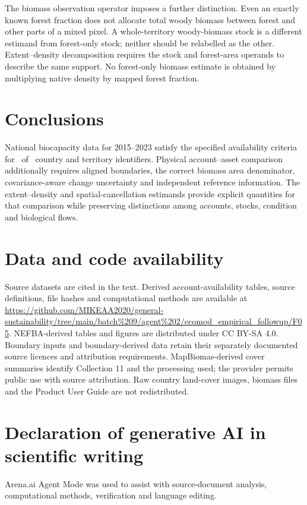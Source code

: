 \documentclass[11pt,a4paper]{article}
\begin{document}
The biomass observation operator imposes a further distinction. Even an exactly known forest fraction does not allocate total woody biomass between forest and other parts of a mixed pixel. A whole-territory woody-biomass stock is a different estimand from forest-only stock; neither should be relabelled as the other. Extent--density decomposition requires the stock and forest-area operands to describe the same support. No forest-only biomass estimate is obtained by multiplying native density by mapped forest fraction.

\section{Conclusions}
National biocapacity data for 2015--2023 satisfy the specified availability criteria for \AccountPass\ of \CountryIDs\ country and territory identifiers. Physical account--asset comparison additionally requires aligned boundaries, the correct biomass area denominator, covariance-aware change uncertainty and independent reference information. The extent--density and spatial-cancellation estimands provide explicit quantities for that comparison while preserving distinctions among accounts, stocks, condition and biological flows.

\section*{Data and code availability}
Source datasets are cited in the text. Derived account-availability tables, source definitions, file hashes and computational methods are available at \url{https://github.com/MIKEAA2020/general-sustainability/tree/main/batch%209/agent%202/ecomod_empirical_followup/F05}. NEFBA-derived tables and figures are distributed under CC BY-SA 4.0. Boundary inputs and boundary-derived data retain their separately documented source licences and attribution requirements. MapBiomas-derived cover summaries identify Collection 11 and the processing used; the provider permits public use with source attribution. Raw country land-cover images, biomass files and the Product User Guide are not redistributed.

\section*{Declaration of generative AI in scientific writing}
Arena.ai Agent Mode was used to assist with source-document analysis, computational methods, verification and language editing.
\end{document}
